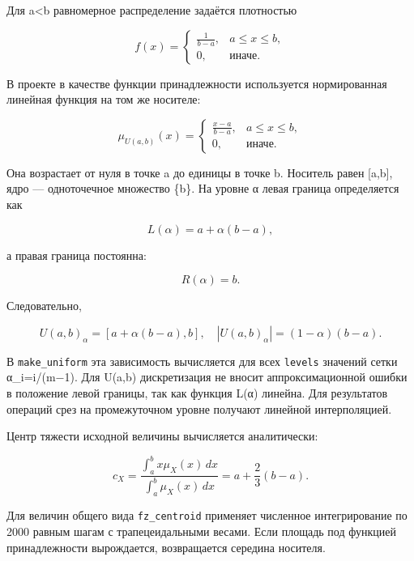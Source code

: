 Для a<b равномерное распределение задаётся плотностью

\begin{equation}
f(x)= \begin{cases} \frac{1}{b-a}, & a\leq x\leq b,\\ 0, & \text{иначе}. \end{cases}
\end{equation}

В проекте в качестве функции принадлежности используется нормированная линейная функция на том же носителе:

\begin{equation}
\mu_{U(a,b)}(x)= \begin{cases} \frac{x-a}{b-a}, & a\leq x\leq b,\\ 0, & \text{иначе}. \end{cases}
\end{equation}

Она возрастает от нуля в точке a до единицы в точке b. Носитель равен [a,b], ядро — одноточечное множество \{b\}. На уровне α левая граница определяется как

\begin{equation}
L(\alpha)=a+\alpha(b-a),
\end{equation}

а правая граница постоянна:

\begin{equation}
R(\alpha)=b.
\end{equation}

Следовательно,

\begin{equation}
U(a,b)_\alpha=[a+\alpha(b-a),b], \quad |U(a,b)_\alpha|=(1-\alpha)(b-a).
\end{equation}

В \texttt{make\_uniform} эта зависимость вычисляется для всех \texttt{levels} значений сетки α\_i=i/(m−1). Для U(a,b) дискретизация не вносит аппроксимационной ошибки в положение левой границы, так как функция L(α) линейна. Для результатов операций срез на промежуточном уровне получают линейной интерполяцией.

Центр тяжести исходной величины вычисляется аналитически:

\begin{equation}
c_X=\frac{\int_a^b x\mu_X(x)\,dx}{\int_a^b\mu_X(x)\,dx} =a+\frac{2}{3}(b-a).
\end{equation}

Для величин общего вида \texttt{fz\_centroid} применяет численное интегрирование по 2000 равным шагам с трапецеидальными весами. Если площадь под функцией принадлежности вырождается, возвращается середина носителя.

